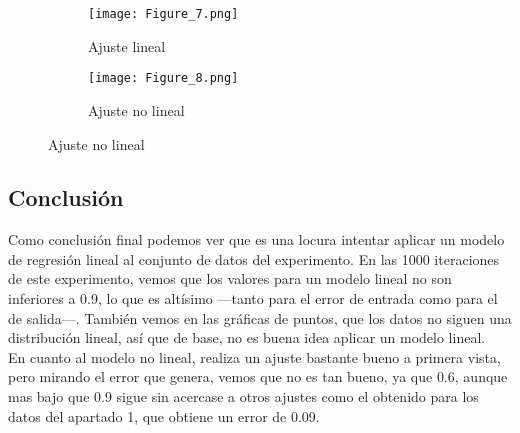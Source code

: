 \begin{figure}[h]
   \centering
   \begin{subfigure}[b]{0.45\textwidth}
      \texttt{[image: Figure\_7.png]}
      \caption{Ajuste lineal}
   \end{subfigure}
   \hfill
   \begin{subfigure}[b]{0.45\textwidth}
      \texttt{[image: Figure\_8.png]}
      \caption{Ajuste no lineal}
   \end{subfigure}
\end{figure}
\subsection{Conclusión}
Como conclusión final podemos ver que es una locura intentar aplicar un modelo de regresión lineal al conjunto de datos del experimento. En las 1000 iteraciones de este experimento, vemos que los valores para un modelo lineal no son inferiores a 0.9, lo que es altísimo ---tanto para el error de entrada como para el de salida---. También vemos en las gráficas de puntos, que los datos no siguen una distribución lineal, así que de base, no es buena idea aplicar un modelo lineal.\\
En cuanto al modelo no lineal, realiza un ajuste bastante bueno a primera vista, pero mirando el error que genera, vemos que no es tan bueno, ya que 0.6, aunque mas bajo que 0.9 sigue sin acercase a otros ajustes como el obtenido para los datos del apartado 1, que obtiene un error de 0.09.


